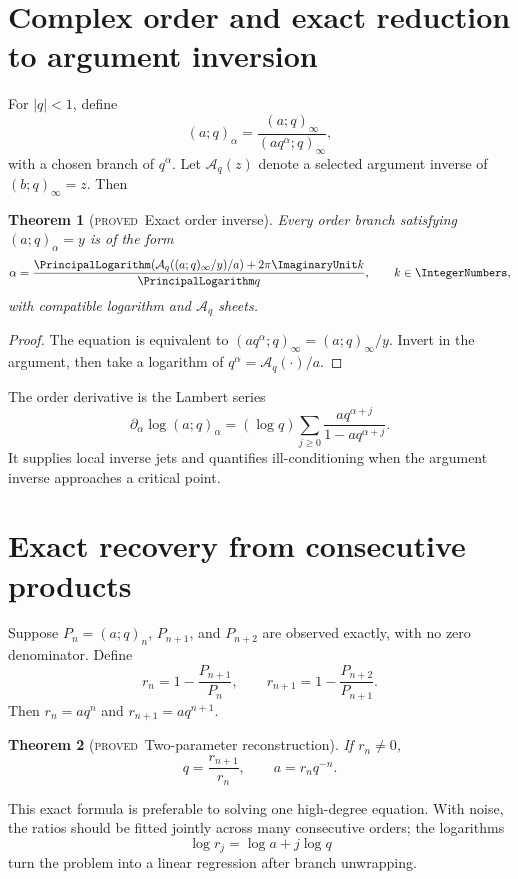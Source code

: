\documentclass[11pt,letterpaper,oneside,openany]{book}
\newtheorem{theorem}{Theorem}[chapter]
\theoremstyle{definition}
\theoremstyle{remark}
\newcommand{\Aq}{\mathcal A_q}
\newcommand{\statusproved}{\textcolor{provedgreen}{\textsc{proved}}}
\begin{document}
\section{Complex order and exact reduction to argument inversion}
For \(|q|<1\), define
\[
 (a;q)_\alpha=\frac{(a;q)_\infty}{(aq^\alpha;q)_\infty},
\]
with a chosen branch of \(q^\alpha\).  Let \(\Aq(z)\) denote a selected
argument inverse of \((b;q)_\infty=z\).  Then
\begin{theorem}[\statusproved\ Exact order inverse]
Every order branch satisfying \((a;q)_\alpha=y\) is of the form
\begin{equation}\label{eq:order-inverse-exact}
 \alpha=\frac{\PrincipalLogarithm(\Aq((a;q)_\infty/y)/a)+2\pi\ImaginaryUnit k}{\PrincipalLogarithm q},
 \qquad k\in\IntegerNumbers,
\end{equation}
with compatible logarithm and \(\Aq\) sheets.
\end{theorem}
\begin{proof}
The equation is equivalent to
\((aq^\alpha;q)_\infty=(a;q)_\infty/y\).  Invert in the argument, then take a
logarithm of \(q^\alpha=\Aq(\cdot)/a\).
\end{proof}

The order derivative is the Lambert series
\begin{equation}\label{eq:order-derivative}
 \partial_\alpha\log(a;q)_\alpha
 =(\log q)\sum_{j\ge0}\frac{aq^{\alpha+j}}{1-aq^{\alpha+j}}.
\end{equation}
It supplies local inverse jets and quantifies ill-conditioning when the
argument inverse approaches a critical point.

\section{Exact recovery from consecutive products}
Suppose \(P_n=(a;q)_n\), \(P_{n+1}\), and \(P_{n+2}\) are observed exactly,
with no zero denominator.  Define
\[
 r_n=1-\frac{P_{n+1}}{P_n},
 \qquad
 r_{n+1}=1-\frac{P_{n+2}}{P_{n+1}}.
\]
Then \(r_n=aq^n\) and \(r_{n+1}=aq^{n+1}\).

\begin{theorem}[\statusproved\ Two-parameter reconstruction]
If \(r_n\ne0\),
\begin{equation}\label{eq:exact-aq-recovery}
 q=\frac{r_{n+1}}{r_n},
 \qquad
 a=r_nq^{-n}.
\end{equation}
\end{theorem}
This exact formula is preferable to solving one high-degree equation.  With
noise, the ratios should be fitted jointly across many consecutive orders;
the logarithms
\[
 \log r_j=\log a+j\log q
\]
turn the problem into a linear regression after branch unwrapping.
\end{document}
